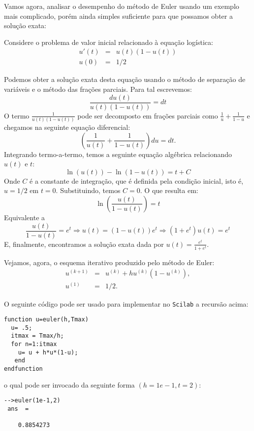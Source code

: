 Vamos agora, analisar o desempenho do método de Euler usando um exemplo mais complicado, porém ainda simples suficiente para que possamos obter a solução exata:
\begin{ex}\label{ex_euler_1}
Considere o problema de valor inicial relacionado à equação logística:
\begin{eqnarray}\label{pvi:logistica}
u'(t)&=&u(t)(1-u(t))\\
u(0)&=&1/2
\end{eqnarray}
\end{ex}
Podemos obter a solução exata desta equação usando o método de separação de variáveis e o método das frações parciais. Para tal escrevemos:
\begin{equation*}
\frac{du(t)}{u(t)(1-u(t))}=dt
\end{equation*}
O termo $\frac{1}{u(t)(1-u(t))}$ pode ser decomposto em frações parciais como $\frac{1}{u}+\frac{1}{1-u}$ e chegamos na seguinte equação diferencial:
\begin{equation*}
\left(\frac{1}{u(t)}+\frac{1}{1-u(t)}\right)du=dt.
\end{equation*}
Integrando termo-a-termo, temos a seguinte equação algébrica relacionando $u(t)$ e $t$:
\begin{equation*}
\ln(u(t))-\ln\left(1-u(t)\right)=t+C
\end{equation*}
Onde $C$ é a constante de integração, que é definida pela condição inicial, isto é, $u=1/2$ em $t=0$. Substituindo, temos $C=0$. O que resulta em:
\begin{equation*}
\ln\left(\frac{u(t)}{1-u(t)}\right)=t
\end{equation*}
Equivalente a
\begin{equation*}
\frac{u(t)}{1-u(t)}=e^{t} \Longrightarrow u(t)=(1-u(t))e^{t} \Longrightarrow (1+e^t)u(t)=e^{t}
\end{equation*}
E, finalmente, encontramos a solução exata dada por $u(t)=\frac{e^t}{1+e^{t}}$.

Vejamos, agora, o esquema iterativo produzido pelo método de Euler:
\begin{eqnarray*}
u^{(k+1)}&=& u^{(k)}+h u^{(k)}(1-u^{(k)}), \\
u^{(1)}&=& 1/2.
\end{eqnarray*}


\ifisscilab
O seguinte código pode ser usado para implementar no \verb+Scilab+ a recursão acima:
\begin{verbatim}
function u=euler(h,Tmax)
  u= .5;
  itmax = Tmax/h;
  for n=1:itmax
    u= u + h*u*(1-u);
   end
endfunction
\end{verbatim}
o qual pode ser invocado da seguinte forma $\left(h=1e-1, t=2\right)$:
\begin{verbatim}
-->euler(1e-1,2)
 ans  =
 
    0.8854273  
\end{verbatim}

